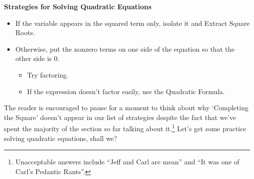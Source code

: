 \documentclass{ximera}
\begin{document}
\colorbox{ResultColor}{\bbm
\centerline{\textbf{Strategies for Solving Quadratic Equations}}

\begin{itemize}

\item  If the variable appears in the squared term only, isolate it and Extract Square Roots.
\item  Otherwise, put the nonzero terms on one side of the equation so that the other side is $0$.
\begin{itemize}
\item  Try factoring.  
\item  If the expression doesn't factor easily, use the Quadratic Formula.

\end{itemize}
\end{itemize}

\ebm}

\medskip

The reader is encouraged to pause for a moment to think about why `Completing the Square' doesn't appear in our list of strategies despite the fact that we've spent the majority of the section so far talking about it.\footnote{Unacceptable answers include ``Jeff and Carl are mean'' and ``It was one of Carl's Pedantic Rants''.}  Let's get some practice solving quadratic equations, shall we?
\end{document}
